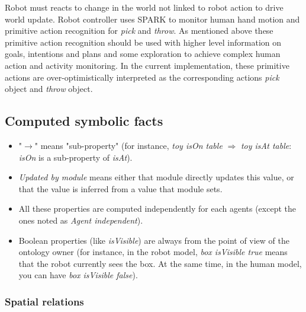 \documentclass{svmult}
\begin{document}
Robot must reacts to change in the world not linked to robot
action to drive world update. Robot controller uses SPARK to monitor human hand
motion and primitive action recognition for \emph{pick} and \emph{throw}. As
mentioned above these primitive action recognition should be used with higher
level information on goals, intentions and plans and some exploration to
achieve complex human action and activity monitoring.  In the current
implementation, these primitive actions are over-optimistically interpreted as
the corresponding actions \emph{pick} object and \emph{throw} object.

\subsection{Computed symbolic facts}
\label{list_facts}

\begin{itemize}

	\item "$\rightarrow$" means "sub-property" (for instance, \emph{toy isOn
	table} $\Rightarrow$ \emph{toy isAt table}: \emph{isOn} is a sub-property
	of \emph{isAt}). 

	\item \emph{Updated by module} means either that module directly updates
	this value, or that the value is inferred from a value that module sets. 
	
	\item All these properties are computed independently for each agents
	(except the ones noted as \emph{Agent independent}). 
	
	\item Boolean properties (like \emph{isVisible}) are always from the point
	of view of the ontology owner (for instance, in the robot model, \emph{box
	isVisible true} means that the robot currently sees the box. At the same
	time, in the human model, you can have \emph{box isVisible false}). 

\end{itemize}


\subsubsection{Spatial relations}
\end{document}
